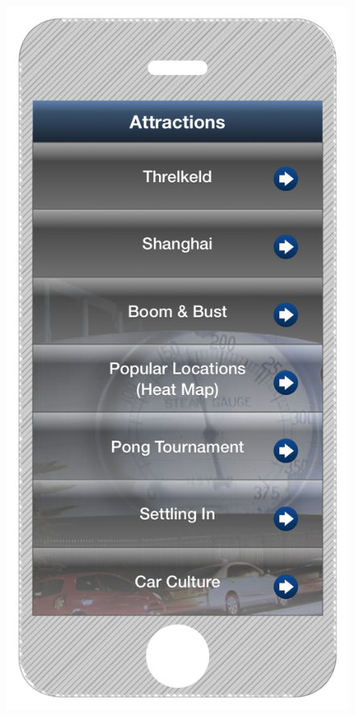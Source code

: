 \documentclass[a4paper,12pt]{article}
\begin{document}
\begin{figure}
\begin{minipage}{.5\textwidth}
  \includegraphics[width=.6\linewidth]{./images/iphone-interface-menu}
  \label{iphone-interface-menu}
\end{minipage}
\end{figure}
\end{document}
